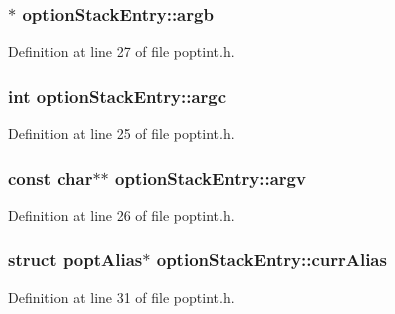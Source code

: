 \subsubsection[{argb}]{$\ast$ option\+Stack\+Entry\+::argb}\label{structoption_stack_entry_acb18bf9c40375399d0fdce906265b514}


Definition at line 27 of file poptint.\+h.

\hypertarget{structoption_stack_entry_abbdb0c53cd6fe3f9dd981f0176d6b76a}{}
\subsubsection[{argc}]{\setlength{\rightskip}{0pt plus 5cm}int option\+Stack\+Entry\+::argc}\label{structoption_stack_entry_abbdb0c53cd6fe3f9dd981f0176d6b76a}


Definition at line 25 of file poptint.\+h.

\hypertarget{structoption_stack_entry_aea9844e231fe3e3ae586033bd8bd9e4d}{}
\subsubsection[{argv}]{\setlength{\rightskip}{0pt plus 5cm}const char$\ast$$\ast$ option\+Stack\+Entry\+::argv}\label{structoption_stack_entry_aea9844e231fe3e3ae586033bd8bd9e4d}


Definition at line 26 of file poptint.\+h.

\hypertarget{structoption_stack_entry_ab314c881eccce3459b2c9865b6ea350f}{}
\subsubsection[{curr\+Alias}]{\setlength{\rightskip}{0pt plus 5cm}struct {\bf popt\+Alias}$\ast$ option\+Stack\+Entry\+::curr\+Alias}\label{structoption_stack_entry_ab314c881eccce3459b2c9865b6ea350f}


Definition at line 31 of file poptint.\+h.

\hypertarget{structoption_stack_entry_abfe5c6a29f094c148cff402fba93268e}{}

